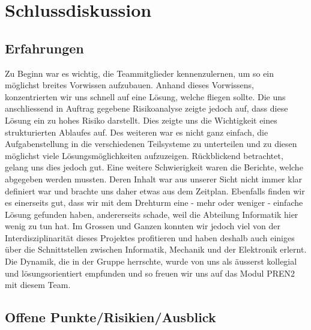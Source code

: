 \section{Schlussdiskussion}

\subsection{Erfahrungen}

Zu Beginn war es wichtig, die Teammitglieder kennenzulernen, um so ein 
möglichst breites Vorwissen aufzubauen. Anhand dieses Vorwissens, 
konzentrierten wir uns schnell auf eine Lösung, welche fliegen sollte. Die uns 
anschliessend in Auftrag gegebene Risikoanalyse zeigte jedoch auf, dass diese 
Lösung ein zu hohes Risiko darstellt. Dies zeigte uns die 
Wichtigkeit eines strukturierten Ablaufes auf. Des weiteren war es nicht ganz 
einfach, die Aufgabenstellung in die verschiedenen Teilsysteme zu unterteilen  
und zu diesen möglichst viele Lösungsmöglichkeiten aufzuzeigen. 
Rückblickend betrachtet, gelang uns dies jedoch gut. Eine weitere 
Schwierigkeit waren die Berichte, welche abgegeben werden mussten. 
Deren Inhalt war aus unserer Sicht nicht immer klar definiert war und brachte uns daher 
etwas aus dem Zeitplan.
Ebenfalls finden wir es einerseits gut, dass wir mit dem Drehturm eine - mehr oder weniger - einfache Lösung gefunden haben, andererseits schade, weil die Abteilung Informatik hier wenig zu tun hat. Im Grossen und Ganzen konnten wir jedoch viel 
von der Interdisziplinarität dieses Projektes profitieren und haben deshalb 
auch einiges über die Schnittstellen zwischen Informatik, Mechanik und der Elektronik 
erlernt. Die Dynamik, die in der Gruppe herrschte, wurde von uns als äusserst kollegial und lösungsorientiert empfunden und so freuen wir uns auf das Modul PREN2 mit diesem Team.


\subsection{Offene Punkte/Risikien/Ausblick}

